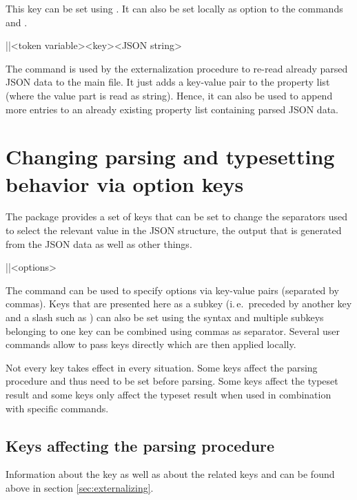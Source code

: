 \documentclass[a4paper]{article}
\begin{document}
{{This key can be set using \macro{\JSONParseSet}. It can also be set locally as option to the commands \macro{\JSONParse} and \macro{\JSONParseFromFile}.

\begin{macrodef}
|\JSONParsePut|{<token variable>}{<key>}{<JSON string>}
\end{macrodef}
The command \macro{\JSONParsePut} is used by the externalization procedure to re-read already parsed JSON data to the main file. It just adds a key-value pair to the property list (where the value part is read as string). Hence, it can also be used to append more entries to an already existing property list containing parsed JSON data.

\section{Changing parsing and typesetting behavior via option keys}\label{sec:options}

The package provides a set of keys that can be set to change the separators used to select the relevant value in the JSON structure, the output that is generated from the JSON data as well as other things.

\begin{macrodef}
|\JSONParseSet|{<options>}
\end{macrodef}
The command \macro{\JSONParseSet} can be used to specify options via key-value pairs (separated by commas). Keys that are presented here as a subkey (i.\,e.\ preceded by another key and a slash such as ) can also be set using the syntax  and multiple subkeys belonging to one key can be combined using commas as separator. Several user commands allow to pass keys directly which are then applied locally.

Not every key takes effect in every situation. Some keys affect the parsing procedure and thus need to be set before parsing. Some keys affect the typeset result and some keys only affect the typeset result when used in combination with specific commands.

\subsection{Keys affecting the parsing procedure}

Information about the key  as well as about the related keys  and  can be found above in section \ref{sec:externalizing}.

}}
\end{document}
